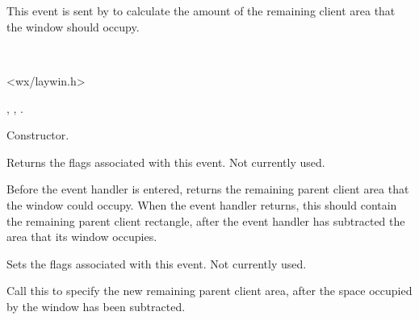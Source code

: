 \section{}\label{wxcalculatelayoutevent}

This event is sent by  to
calculate the amount of the remaining client area that the window should
occupy.


\\


<wx/laywin.h>


\twocolwidtha{7cm}%
\begin{twocollist}\itemsep=0pt
\end{twocollist}


,\rtfsp
{},\rtfsp
{}.




Constructor.

\label{wxcalculatelayouteventgetflags}


Returns the flags associated with this event. Not currently used.

\label{wxcalculatelayouteventgetrect}


Before the event handler is entered, returns the remaining parent client area that the window
could occupy. When the event handler returns, this should contain the remaining parent client rectangle,
after the event handler has subtracted the area that its window occupies.

\label{wxcalculatelayouteventsetflags}


Sets the flags associated with this event. Not currently used.

\label{wxcalculatelayouteventsetrect}


Call this to specify the new remaining parent client area, after the space occupied by the
window has been subtracted.

